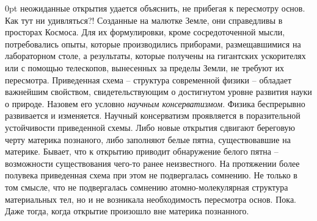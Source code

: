 \begin{multicols}{2}
  0pt \columnwidth%
  0pt \columnwidth%
 неожиданные открытия удается объяснить, не прибегая к пересмотру основ.
Как тут ни удивляться?! Созданные на малютке Земле,
они справедливы в просторах Космоса. Для их формулировки, кроме сосредоточенной мысли,
потребовались опыты, которые производились приборами, размещавшимися на лабораторном столе, а результаты,
которые получены на гигантских ускорителях или с
помощью телескопов, вынесенных за пределы Земли, не требуют их пересмотра.
Приведенная схема – структура современной физики – обладает важнейшим свойством,
свидетельствующим о достигнутом уровне развития науки о
природе. Назовем его условно
\textit{научным консерватизмом}. Физика беспрерывно развивается
и изменяется. Научный консерватизм проявляется в поразительной устойчивости приведенной схемы. Либо новые открытия сдвигают береговую черту
материка познаного, либо заполняют белые пятна, существовавшие на материке. Бывает,
что к открытию приводит обнаружение белого пятна – возможности существования
чего-то ранее неизвестного. На протяжении более полувека приведенная схема при этом не подвергалась
сомнению. Не только в том смысле, что не подвергалась сомнению атомно-молекулярная структура материальных тел, но и не возникала необходимость пересмотра основ. Пока. Даже тогда, когда открытие произошло вне материка познанного.
\end{multicols}
